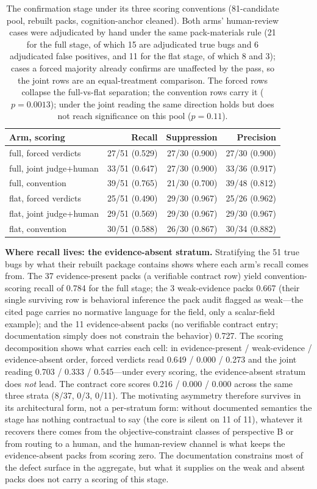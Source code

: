 \documentclass[acmsmall,screen,review,anonymous]{acmart}
\begin{document}
\begin{table}[t]
\caption{The confirmation stage under its three scoring conventions (81-candidate pool, rebuilt packs, cognition-anchor cleaned). Both arms' human-review cases were adjudicated by hand under the same pack-materials rule (21 for the full stage, of which 15 are adjudicated true bugs and 6 adjudicated false positives, and 11 for the flat stage, of which 8 and 3); cases a forced majority already confirms are unaffected by the pass, so the joint rows are an equal-treatment comparison. The forced rows collapse the full-vs-flat separation; the convention rows carry it ($p{=}0.0013$); under the joint reading the same direction holds but does not reach significance on this pool ($p{=}0.11$).}
\label{tab:scorings}
\small
\begin{tabular}{@{}lrrr@{}}
\toprule
Arm, scoring & Recall & Suppression & Precision \\
\midrule
full, forced verdicts & 27/51 (0.529) & 27/30 (0.900) & 27/30 (0.900) \\
full, joint judge+human & 33/51 (0.647) & 27/30 (0.900) & 33/36 (0.917) \\
full, convention & 39/51 (0.765) & 21/30 (0.700) & 39/48 (0.812) \\
\midrule
flat, forced verdicts & 25/51 (0.490) & 29/30 (0.967) & 25/26 (0.962) \\
flat, joint judge+human & 29/51 (0.569) & 29/30 (0.967) & 29/30 (0.967) \\
flat, convention & 30/51 (0.588) & 26/30 (0.867) & 30/34 (0.882) \\
\bottomrule
\end{tabular}
\end{table}

\textbf{Where recall lives: the evidence-absent stratum.}
Stratifying the 51 true bugs by what their rebuilt package contains shows where each arm's recall comes from. The 37 evidence-present packs (a verifiable contract row) yield convention-scoring recall of 0.784 for the full stage; the 3 weak-evidence packs 0.667 (their single surviving row is behavioral inference the pack audit flagged as weak---the cited page carries no normative language for the field, only a scalar-field example); and the 11 evidence-absent packs (no verifiable contract entry; documentation simply does not constrain the behavior) 0.727. The scoring decomposition shows what carries each cell: in evidence-present / weak-evidence / evidence-absent order, forced verdicts read 0.649 / 0.000 / 0.273 and the joint reading 0.703 / 0.333 / 0.545---under every scoring, the evidence-absent stratum does \emph{not} lead. The contract core scores 0.216 / 0.000 / 0.000 across the same three strata (8/37, 0/3, 0/11). The motivating asymmetry therefore survives in its architectural form, not a per-stratum form: without documented semantics the stage has nothing contractual to say (the core is silent on 11 of 11), whatever it recovers there comes from the objective-constraint classes of perspective B or from routing to a human, and the human-review channel is what keeps the evidence-absent packs from scoring zero. The documentation constrains most of the defect surface in the aggregate, but what it supplies on the weak and absent packs does not carry a scoring of this stage.
\end{document}
